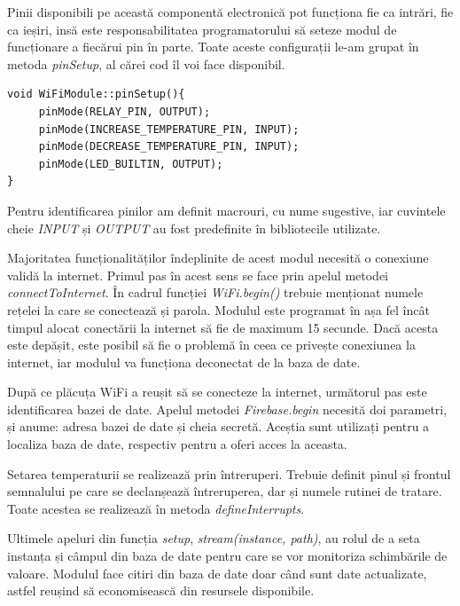 	Pinii disponibili pe această componentă electronică pot funcționa fie ca intrări, fie ca ieșiri, insă este responsabilitatea programatorului să seteze modul de funcționare a fiecărui pin în parte. Toate aceste configurații le-am grupat în metoda \textit{pinSetup}, al cărei cod îl voi face disponibil.

\vspace{1em}

\begin{lstlisting}
void WiFiModule::pinSetup(){
     pinMode(RELAY_PIN, OUTPUT);
     pinMode(INCREASE_TEMPERATURE_PIN, INPUT);
     pinMode(DECREASE_TEMPERATURE_PIN, INPUT);
     pinMode(LED_BUILTIN, OUTPUT);
}
\end{lstlisting}

\vspace{2em}	

	Pentru identificarea pinilor am definit macrouri, cu nume sugestive, iar cuvintele cheie \textit{INPUT} și \textit{OUTPUT} au fost predefinite în bibliotecile utilizate.

	Majoritatea funcționalităților îndeplinite de acest modul necesită o conexiune validă la internet. Primul pas în acest sens se face prin apelul metodei \textit{connectToInternet}. În cadrul funcției \textit{WiFi.begin()} trebuie menționat numele rețelei la care se conectează și parola. Modulul este programat în așa fel încât timpul alocat conectării la internet să fie de maximum 15 secunde. Dacă acesta este depășit, este posibil să fie o problemă în ceea ce privește conexiunea la internet, iar modulul va funcționa deconectat de la baza de date.
 
	După ce plăcuța WiFi a reușit să se conecteze la internet, următorul pas este identificarea bazei de date. Apelul metodei \textit{Firebase.begin} necesită doi parametri, și anume: adresa bazei de date și cheia secretă. Aceștia sunt utilizați pentru a localiza baza de date, respectiv pentru a oferi acces la aceasta.

	Setarea temperaturii se realizează prin întreruperi. Trebuie definit pinul și frontul semnalului pe care se declanșează întreruperea, dar și numele rutinei de tratare. Toate acestea se realizează în metoda \textit{defineInterrupts}.

	Ultimele apeluri din funcția \textit{setup}, \textit{stream(instance, path)}, au rolul de a seta instanța și câmpul din baza de date pentru care se vor monitoriza schimbările de valoare. Modulul face citiri din baza de date doar când sunt date actualizate, astfel reușind să economisească din resursele disponibile.

